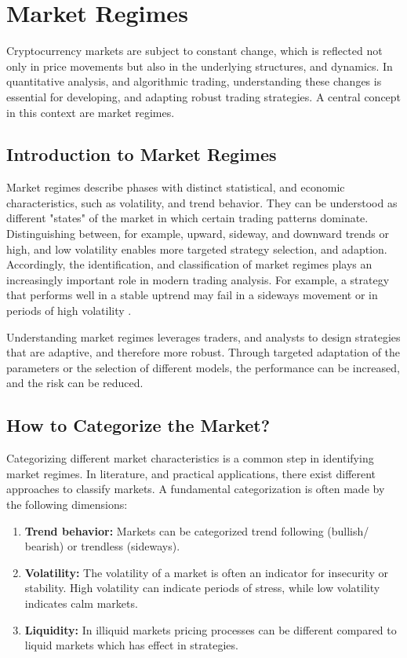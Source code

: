 \section{Market Regimes}

Cryptocurrency markets are subject to constant change, which is reflected not only in price movements but also in the underlying structures, and dynamics.
In quantitative analysis, and algorithmic trading, understanding these changes is essential for developing, and adapting robust trading strategies.
A central concept in this context are market regimes.

\subsection{Introduction to Market Regimes}

Market regimes describe phases with distinct statistical, and economic characteristics, such as volatility, and trend behavior.
They can be understood as different "states" of the market in which certain trading patterns dominate.
Distinguishing between, for example, upward, sideway, and downward trends or high, and low volatility enables more targeted strategy selection, and adaption.
Accordingly, the identification, and classification of market regimes plays an increasingly important role in modern trading analysis.
For example, a strategy that performs well in a stable uptrend may fail in a sideways movement or in periods of high volatility \cite{macrosynergy-market-regime-introduction}.

Understanding market regimes leverages traders, and analysts to design strategies that are adaptive, and therefore more robust.
Through targeted adaptation of the parameters or the selection of different models, the performance can be increased, and the risk can be reduced.

\subsection{How to Categorize the Market?}
\label{chap:market-regime-categories}

Categorizing different market characteristics is a common step in identifying market regimes.
In literature, and practical applications, there exist different approaches to classify markets.
A fundamental categorization is often made by the following dimensions:

\begin{enumerate}
    \item \textbf{Trend behavior:} Markets can be categorized trend following (bullish/ bearish) or trendless (sideways).
    \item \textbf{Volatility:} The volatility of a market is often an indicator for insecurity or stability.
    High volatility can indicate periods of stress, while low volatility indicates calm markets.
    \item \textbf{Liquidity:} In illiquid markets pricing processes can be different compared to liquid markets which has effect in strategies.
\end{enumerate}

